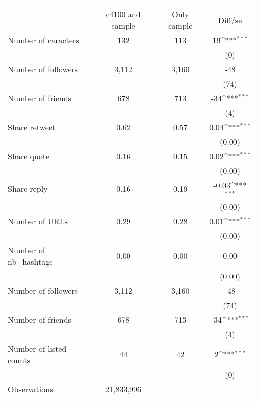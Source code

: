 {
\def\sym#1{\ifmmode^{#1}\else\(^{#1}\)\fi}
\begin{tabular}{l*{1}{ccc}}
\hline\hline
                    &\multicolumn{3}{c}{}                           \\
                    &c4100 and sample& Only sample&     Diff/se         \\
\hline
Number of caracters &         132&         113&          19\sym{***}\\
                    &            &            &         (0)         \\
Number of followers &       3,112&       3,160&         -48         \\
                    &            &            &        (74)         \\
Number of friends   &         678&         713&         -34\sym{***}\\
                    &            &            &         (4)         \\
Share retweet       &        0.62&        0.57&        0.04\sym{***}\\
                    &            &            &      (0.00)         \\
Share quote         &        0.16&        0.15&        0.02\sym{***}\\
                    &            &            &      (0.00)         \\
Share reply         &        0.16&        0.19&       -0.03\sym{***}\\
                    &            &            &      (0.00)         \\
Number of URLs      &        0.29&        0.28&        0.01\sym{***}\\
                    &            &            &      (0.00)         \\
Number of nb\_hashtags&        0.00&        0.00&        0.00         \\
                    &            &            &      (0.00)         \\
Number of followers &       3,112&       3,160&         -48         \\
                    &            &            &        (74)         \\
Number of friends   &         678&         713&         -34\sym{***}\\
                    &            &            &         (4)         \\
Number of listed counts&          44&          42&           2\sym{***}\\
                    &            &            &         (0)         \\
\hline
Observations        &  21,833,996&            &                     \\
\hline\hline
\end{tabular}
}

